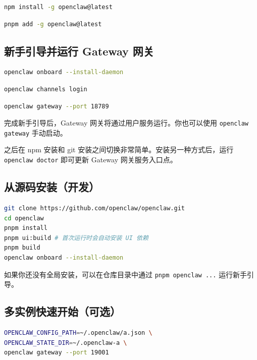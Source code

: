 \begin{lstlisting}[language=bash]
    npm install -g openclaw@latest
\end{lstlisting}

\begin{lstlisting}[language=bash]
    pnpm add -g openclaw@latest
\end{lstlisting}


\subsection{新手引导并运行 Gateway 网关}


\begin{lstlisting}[language=bash]
    openclaw onboard --install-daemon
\end{lstlisting}

\begin{lstlisting}[language=bash]
    openclaw channels login
\end{lstlisting}

\begin{lstlisting}[language=bash]
    openclaw gateway --port 18789
\end{lstlisting}


完成新手引导后，Gateway 网关将通过用户服务运行。你也可以使用 \texttt{openclaw gateway} 手动启动。

之后在 npm 安装和 git 安装之间切换非常简单。安装另一种方式后，运行
\texttt{openclaw doctor} 即可更新 Gateway 网关服务入口点。

\subsection{从源码安装（开发）}


\begin{lstlisting}[language=bash]
git clone https://github.com/openclaw/openclaw.git
cd openclaw
pnpm install
pnpm ui:build # 首次运行时会自动安装 UI 依赖
pnpm build
openclaw onboard --install-daemon
\end{lstlisting}


如果你还没有全局安装，可以在仓库目录中通过 \texttt{pnpm openclaw ...} 运行新手引导。

\subsection{多实例快速开始（可选）}


\begin{lstlisting}[language=bash]
OPENCLAW_CONFIG_PATH=~/.openclaw/a.json \
OPENCLAW_STATE_DIR=~/.openclaw-a \
openclaw gateway --port 19001
\end{lstlisting}



